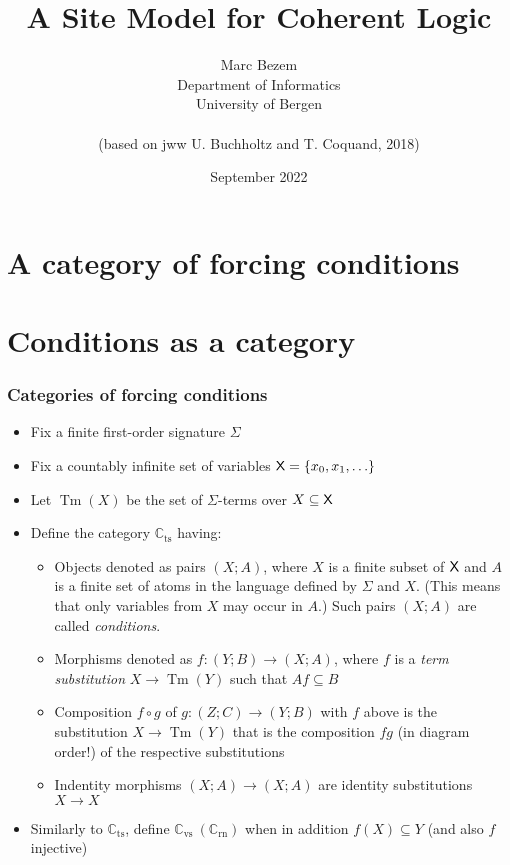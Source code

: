 \documentclass[handout,11pt]{beamer}
\title{A Site Model for Coherent Logic}
\author{Marc Bezem\\
Department of Informatics\\
University of Bergen\\
\mbox{ }\\
(based on jww U. Buchholtz and T. Coquand, 2018)
}
\date{September 2022}
\newcommand{\set}[1]{\{#1\}}
\newcommand{\XX}{\mbox{\sf X}}
\newcommand*{\subvs}{_{\mathrm{vs}}}
\newcommand*{\subrn}{_{\mathrm{rn}}}
\newcommand*{\subts}{_{\mathrm{ts}}}
\newcommand{\Cvs}{\mathbb{C}\subvs}
\newcommand{\Crn}{\mathbb{C}\subrn}
\newcommand{\Cts}{\mathbb{C}\subts}
\DeclareMathOperator{\Tm}{Tm}
\begin{document}
\frame{\titlepage}

\section[Outline]{}
\frame{\tableofcontents}


\section{A category of forcing conditions}

\section{Conditions as a category}

\begin{frame}
\frametitle{Categories of forcing conditions}
 \begin{itemize}[<+->]   %
   \item Fix a finite first-order signature $\Sigma$
   \item Fix a countably infinite set of variables $\XX=\set{x_0,x_1,\ldots}$
   \item Let $\Tm(X)$ be the set of $\Sigma$-terms over $X \subseteq \XX$    
   \item Define the category $\Cts$ having:
    \begin{itemize}[<+->]   %
    \item Objects denoted as pairs $(X;A)$,
    where $X$ is a finite subset of $\XX$ and $A$ is a finite set
    of atoms in the language defined by $\Sigma$ and $X$.
    (This means that only variables from $X$ may occur in $A$.)
    Such pairs $(X;A)$ are called \emph{conditions}.
    \item Morphisms denoted as $f : (Y;B) \to (X;A)$, where $f$ is a 
    \emph{term substitution} $X \to \Tm(Y)$ such that $Af \subseteq B$
    \item Composition $f\circ g$ of $g : (Z;C) \to (Y;B)$ with $f$ above is
    the substitution $X \to \Tm(Y)$ that is the composition $fg$
    (in diagram order!) of the respective substitutions
    \item Indentity morphisms $(X;A)\to(X;A)$ are identity 
    substitutions $X\to X$
    \end{itemize}
    \item Similarly to $\Cts$, define $\Cvs~(\Crn)$ when 
    in addition $f(X)\subseteq Y$ (and also $f$ injective)
 \end{itemize}
\end{frame}
\end{document}
